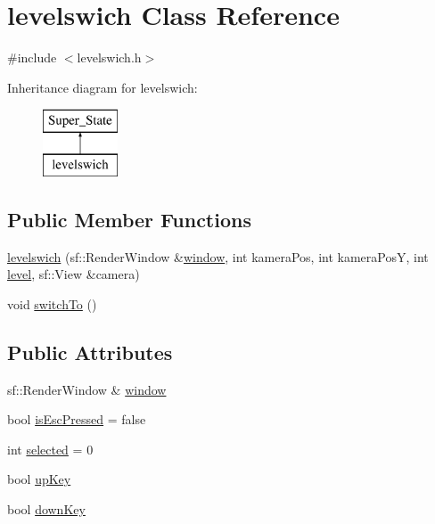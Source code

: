 \hypertarget{classlevelswich}{}\section{levelswich Class Reference}
\label{classlevelswich}


{\ttfamily \#include $<$levelswich.\+h$>$}

Inheritance diagram for levelswich\+:\begin{figure}[H]
\begin{center}
\leavevmode
\includegraphics[height=2.000000cm]{classlevelswich}
\end{center}
\end{figure}
\subsection*{Public Member Functions}
\begin{DoxyCompactItemize}
\item 
\hyperlink{classlevelswich_adf18e229424c4cd649cb454fed0dc5a4}{levelswich} (sf\+::\+Render\+Window \&\hyperlink{classlevelswich_af2e53af5be069bb83ea55370bf8a958f}{window}, int kamera\+Pos, int kamera\+PosY, int \hyperlink{class_super___state_ad6b74d4864a4e2cccf58316cd1af2e83}{level}, sf\+::\+View \&camera)
\item 
void \hyperlink{classlevelswich_a0ef443c96e4db2bcbee624e59d622699}{switch\+To} ()
\end{DoxyCompactItemize}
\subsection*{Public Attributes}
\begin{DoxyCompactItemize}
\item 
sf\+::\+Render\+Window \& \hyperlink{classlevelswich_af2e53af5be069bb83ea55370bf8a958f}{window}
\item 
bool \hyperlink{classlevelswich_ad242526d365bd2ca14c7fe4016b1491c}{is\+Esc\+Pressed} = false
\item 
int \hyperlink{classlevelswich_a176dacf3b921f80c40ed241650f7687f}{selected} = 0
\item 
bool \hyperlink{classlevelswich_a6cb148588f510bbae515411e8ca97b26}{up\+Key}
\item 
bool \hyperlink{classlevelswich_a8823485cfcba6cb615c74610c069c888}{down\+Key}
\end{DoxyCompactItemize}


